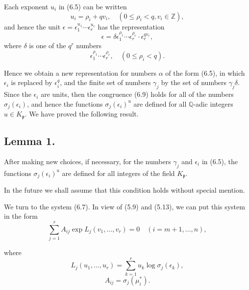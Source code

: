 \documentclass{article}
\begin{document}
Each exponent $u_i$ in (6.5) can be written
\begin{equation}
u_i = \rho_i + q v_i, \quad (0 \leq \rho_i < q, v_i \in \mathbb{Z}),
\end{equation}
and hence the unit $\epsilon = \epsilon_1^{u_1} \cdots \epsilon_r^{u_r}$ has the representation
\begin{equation}
\epsilon = \delta \epsilon_1^{\rho_1} \cdots \epsilon_r^{\rho_r} \cdot \epsilon_r^{q v_r},
\end{equation}
where $\delta$ is one of the $q^r$ numbers
\begin{equation}
\epsilon_1^{\rho_1} \cdots \epsilon_r^{\rho_r}, \quad (0 \leq \rho_i < q).
\end{equation}

Hence we obtain a new representation for numbers $\alpha$ of the form (6.5), 
in which $\epsilon_i$ is replaced by $\epsilon_i^q$, and the finite set of numbers $\gamma_j$ 
by the set of numbers $\gamma_j \delta$. Since the $\epsilon_i$ are units, then the congruence 
(6.9) holds for all of the numbers $\sigma_j(\epsilon_i)$, and hence the functions $\sigma_j(\epsilon_i)^u$ 
are defined for all $\mathbb{Q}$-adic integers $u \in K_{\mathfrak{p}}$. We have proved the following result.

\subsection*{Lemma 1.}
After making new choices, if necessary, for the numbers $\gamma_j$ and $\epsilon_i$ in (6.5), 
the functions $\sigma_j(\epsilon_i)^u$ are defined for all integers of the field $K_{\mathfrak{p}}$.

In the future we shall assume that this condition holds without special mention.

We turn to the system (6.7). In view of (5.9) and (5.13), we can put this system in the form
\begin{equation}
\sum_{j=1}^r A_{ij} \exp L_j(v_1, \ldots, v_r) = 0 \quad (i = m + 1, \ldots, n),
\end{equation}




where 
\begin{equation}
L_j(u_1, \ldots, u_r) = \sum_{k=1}^r u_k \log \sigma_j(\epsilon_k),
\end{equation}
\begin{equation}
A_{ij} = \sigma_j(\mu_i^*).
\end{equation}
\end{document}

